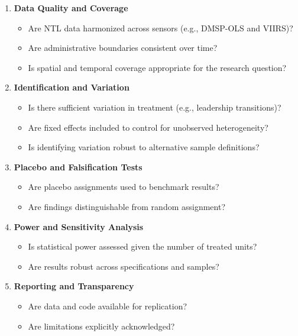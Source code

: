 \documentclass[12pt,a4paper]{article}
\begin{document}
\begin{enumerate}
	\item \textbf{Data Quality and Coverage}
	\begin{itemize}
		\item Are NTL data harmonized across sensors (e.g., DMSP-OLS and VIIRS)?
		\item Are administrative boundaries consistent over time?
		\item Is spatial and temporal coverage appropriate for the research question?
	\end{itemize}
	
	\item \textbf{Identification and Variation}
	\begin{itemize}
		\item Is there sufficient variation in treatment (e.g., leadership transitions)?
		\item Are fixed effects included to control for unobserved heterogeneity?
		\item Is identifying variation robust to alternative sample definitions?
	\end{itemize}
	
	\item \textbf{Placebo and Falsification Tests}
	\begin{itemize}
		\item Are placebo assignments used to benchmark results?
		\item Are findings distinguishable from random assignment?
	\end{itemize}
	
	\item \textbf{Power and Sensitivity Analysis}
	\begin{itemize}
		\item Is statistical power assessed given the number of treated units?
		\item Are results robust across specifications and samples?
	\end{itemize}
	
	\item \textbf{Reporting and Transparency}
	\begin{itemize}
		\item Are data and code available for replication?
		\item Are limitations explicitly acknowledged?
	\end{itemize}

	
\end{enumerate}
\end{document}
